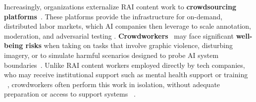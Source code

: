 Increasingly, organizations externalize RAI content work to \textbf{crowdsourcing platforms}~\cite{howe2006rise, berg2018digital}.  These platforms provide the infrastructure for on-demand, distributed labor markets, which AI companies then leverage to scale annotation, moderation, and adversarial testing \cite{udupa2023ethical, mann2025meta, egelman2014crowdsourcing}.
\textbf{Crowdworkers}~\cite{berg2018digital} may face significant \textbf{well-being risks} when taking on tasks that involve graphic violence, disturbing imagery, or to simulate harmful scenarios designed to probe AI system boundaries~\cite{qian2025locating}. 
Unlike RAI content workers employed directly by tech companies, who may receive institutional support such as mental health support or training ~\cite{qian2025aura, roberts2016commercial, steiger_psychological_2021}, crowdworkers often perform this work in isolation, without adequate preparation or access to support systems ~\cite{schlicher2021flexible, berastegui2021exposure}. 




